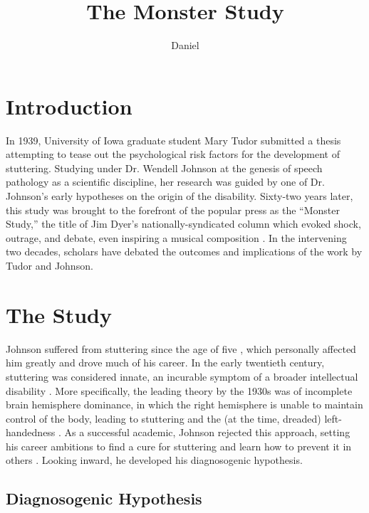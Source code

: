 \documentclass{../../../coursework}
\title{The Monster Study}
\subtitle{}
\author{Daniel}{Glenn}{Leonard}
\date{\displaydate{date}}
\begin{document}
\maketitle

\section{Introduction}

In 1939, University of Iowa graduate student Mary Tudor submitted a
thesis attempting to tease out the psychological risk factors for the
development of stuttering. Studying under Dr. Wendell Johnson at the
genesis of speech pathology as a scientific discipline, her research was
guided by one of Dr. Johnson's early hypotheses on the origin of the
disability. Sixty-two years later, this study was brought to the
forefront of the popular press as the ``Monster Study,'' the title of
Jim Dyer's \parencite*{Dye01} nationally-syndicated column which evoked shock,
outrage, and debate, even inspiring a musical composition \parencite{Gar191}.
In the intervening two decades, scholars have debated the
outcomes and implications of the work by Tudor and Johnson.

\section{The Study}

Johnson suffered from stuttering since the age of five \parencite{GoldfarbEthics01},
which personally affected him greatly and drove much of his career. In
the early twentieth century, stuttering was considered innate, an
incurable symptom of a broader intellectual disability \parencite{GoldfarbEthics08}.
More specifically, the leading theory by the 1930s was of
incomplete brain hemisphere dominance, in which the right hemisphere is
unable to maintain control of the body, leading to stuttering and the
(at the time, dreaded) left-handedness \parencite{Sil88}. As a
successful academic, Johnson rejected this approach, setting his career
ambitions to find a cure for stuttering and learn how to prevent it in
others \parencite{GoldfarbEthics03}. Looking inward, he developed his
diagnosogenic hypothesis.

\subsection{Diagnosogenic Hypothesis}
\end{document}
